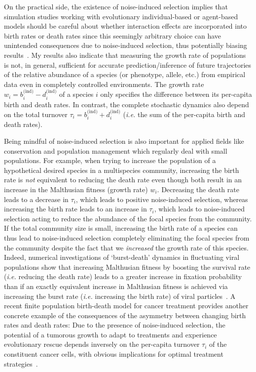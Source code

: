 On the practical side, the existence of noise-induced selection implies that simulation studies working with evolutionary individual-based or agent-based models should be careful about whether interaction effects are incorporated into birth rates or death rates since this seemingly arbitrary choice can have unintended consequences due to noise-induced selection, thus potentially biasing results~\citep{mcleod_social_2019,kuosmanen_turnover_2022}. My results also indicate that measuring the growth rate of populations is not, in general, sufficient for accurate prediction/inference of future trajectories of the relative abundance of a species (or phenotype, allele, etc.) from empirical data even in completely controlled environments. The growth rate $w_i = b^{\textrm{(ind)}}_{i} - d^{\textrm{(ind)}}_{i}$ of a species $i$ only specifies the difference between its per-capita birth and death rates. In contrast, the complete stochastic dynamics also depend on the total turnover $\tau_i = b^{\textrm{(ind)}}_{i} + d^{\textrm{(ind)}}_{i}$ (\emph{i.e.} the sum of the per-capita birth and death rates).

Being mindful of noise-induced selection is also important for applied fields like conservation and population management which regularly deal with small populations. For example, when trying to increase the population of a hypothetical desired species in a multispecies community, increasing the birth rate is \emph{not} equivalent to reducing the death rate even though both result in an increase in the Malthusian fitness (growth rate) $w_i$. Decreasing the death rate leads to a decrease in $\tau_i$, which leads to positive noise-induced selection, whereas increasing the birth rate leads to an increase in $\tau_i$, which leads to noise-induced selection acting to reduce the abundance of the focal species from the community. If the total community size is small, increasing the birth rate of a species can thus lead to noise-induced selection completely eliminating the focal species from the community despite the fact that we \emph{increased} the growth rate of this species. Indeed, numerical investigations of `burst-death' dynamics in fluctuating viral populations show that increasing Malthusian fitness by boosting the survival rate (\emph{i.e.} reducing the death rate) leads to a greater increase in fixation probability than if an exactly equivalent increase in Malthusian fitness is achieved via increasing the burst rate (\emph{i.e.} increasing the birth rate) of viral particles~\citep{alexander_fixation_2008}.  A recent finite population birth-death model for cancer treatment provides another concrete example of the consequences of the asymmetry between changing birth rates and death rates: Due to the presence of noise-induced selection, the potential of a tumorous growth to adapt to treatments and experience evolutionary rescue depends inversely on the per-capita turnover $\tau_i$ of the constituent cancer cells, with obvious implications for optimal treatment strategies~\citep{raatz_promoting_2023}.

